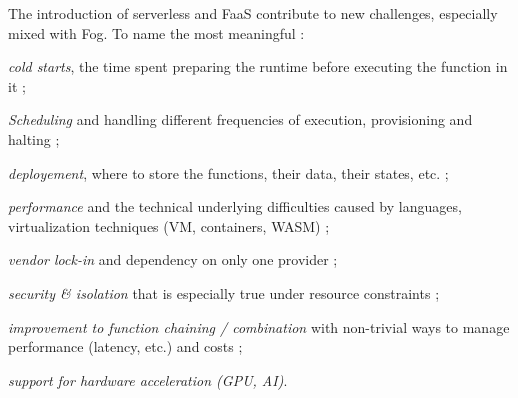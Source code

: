 \documentclass[11pt]{sdm}
\begin{document}
The introduction of serverless and \gls{FaaS} contribute to new challenges, especially mixed with Fog. To name the most meaningful \cite{kjorveziroski_iot_2021}:
\begin{enumerate*}
	\item \emph{cold starts}, the time spent preparing the runtime before executing the function in it ;
	\item \emph{Scheduling} and handling different frequencies of execution, provisioning and halting ;
	\item \emph{deployement}, where to store the functions, their data, their states, etc. ;
	\item \emph{performance} and the technical underlying difficulties caused by languages, virtualization techniques (\gls{VM}, containers, WASM) ;
	\item \emph{vendor lock-in} and dependency on only one provider ;
	\item \emph{security \& isolation} that is especially true under resource constraints \cite{maurice_hello_2017} ;
	\item \emph{improvement to function chaining / combination} with non-trivial ways to manage performance (latency, etc.) and costs \cite{elgamal_costless_2018} ;
	\item \emph{support for hardware acceleration (GPU, AI)}.
\end{enumerate*}

%

\end{document}
